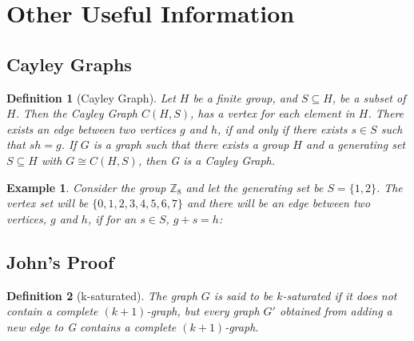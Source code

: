 \documentclass[12pt]{article}
\theoremstyle{parenbold}
\newtheorem{definition}{Definition}[section]
\newtheorem{exmp}{Example}[section]
\begin{document}
\section{Other Useful Information}

\subsection{Cayley Graphs}
\begin{definition}[Cayley Graph]
Let $H$ be a finite group, and $S \subseteq H$, be a subset of $H$. Then the Cayley Graph $C(H,S)$, has a vertex for each element in $H$. There exists an edge between two vertices $g$ and $h$, if and only if there exists $s \in S$ such that $ sh = g$. If $G$ is a graph such that there exists a group $H$ and a generating set $S \subseteq H$ with $G \cong C(H,S)$, then G is a Cayley Graph. \cite{franccayley}

\end{definition}

\begin{exmp}
Consider the group $\mathbb{Z}_8$ and let the generating set be $S = \{1,2\}$. The vertex set will be $\{0,1,2,3,4,5,6,7\}$ and there will be an edge between two vertices, $g$ and $h$, if for an $s \in S$, $g + s = h$:
\\


\end{exmp}

\subsection{John's Proof}

\begin{definition}[k-saturated]
The graph $G$ is said to be $k$-saturated if it does not contain a complete $(k+1)$-graph, but every graph $G'$ obtained from adding a new edge to G contains a complete $(k+1)$-graph. \cite{kSaturated}
\end{definition}
\end{document}
